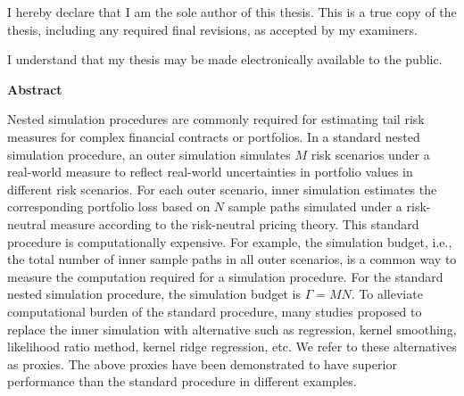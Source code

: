   

\cleardoublepage

  \noindent
I hereby declare that I am the sole author of this thesis. This is a true copy of the thesis, including any required final revisions, as accepted by my examiners.

  \bigskip
  
  \noindent
I understand that my thesis may be made electronically available to the public.

\cleardoublepage


\begin{center}\textbf{Abstract}\end{center}

Nested simulation procedures are commonly required for estimating tail risk measures for complex financial contracts or portfolios. 
In a standard nested simulation procedure, an outer simulation simulates $M$ risk scenarios under a real-world measure to reflect real-world uncertainties in portfolio values in different risk scenarios. 
For each outer scenario, inner simulation estimates the corresponding portfolio loss based on $N$ sample paths simulated under a risk-neutral measure according to  the risk-neutral pricing theory. 
This standard procedure is computationally expensive. 
For example, the simulation budget, i.e., the total number of inner sample paths in all outer scenarios, is a common way to measure the computation required for a simulation procedure. For the standard nested simulation procedure, the simulation budget is $\Gamma = MN$.
To alleviate computational burden of the standard procedure, many studies proposed to replace the inner simulation with alternative such as regression, kernel smoothing, likelihood ratio method, kernel ridge regression, etc. 
We refer to these alternatives as proxies. 
The above proxies have been demonstrated to have superior performance than the standard procedure in different examples. 

